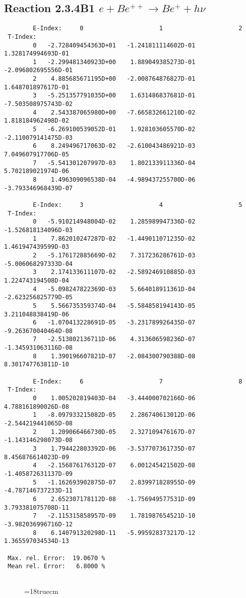 \subsection{
Reaction 2.3.4B1  $e + Be^{++} \rightarrow Be^+ + h\nu$
}

\begin{verbatim}
        E-Index:     0                     1                     2
 T-Index:
        0   -2.728409454363D+01   -1.241811114602D-01    1.328174994693D-01
        1   -2.299481340923D+00    1.889049385273D-01   -2.096802695556D-01
        2    4.885685671195D+00   -2.008764876827D-01    1.648701897617D-01
        3   -5.251357791035D+00    1.631486837681D-01   -7.503508975743D-02
        4    2.543387065980D+00   -7.665832661210D-02    1.818184962498D-02
        5   -6.269100539052D-01    1.928103605570D-02   -2.110079141475D-03
        6    8.249496717063D-02   -2.610043486921D-03    7.049607917706D-05
        7   -5.541301207997D-03    1.802133911336D-04    5.702189021974D-06
        8    1.496309096538D-04   -4.989437255700D-06   -3.793346968439D-07

        E-Index:     3                     4                     5
 T-Index:
        0   -5.910214948004D-02    1.285989947336D-02   -1.526818134096D-03
        1    7.862010247287D-02   -1.449011071235D-02    1.461947439599D-03
        2   -5.176172885669D-02    7.317236286761D-03   -5.006068297333D-04
        3    2.174133611107D-02   -2.589246910885D-03    1.224743194508D-04
        4   -5.098247822369D-03    5.664018911361D-04   -2.623256825779D-05
        5    5.566735359374D-04   -5.584858194143D-05    3.211048838419D-06
        6   -1.070413228691D-05   -3.231789926435D-07   -9.263670040464D-08
        7   -2.513802136711D-06    4.313606598236D-07   -1.345931063116D-08
        8    1.390196607821D-07   -2.084300790388D-08    8.301747763811D-10

        E-Index:     6                     7                     8
 T-Index:
        0    1.005202819403D-04   -3.444000702166D-06    4.788161890026D-08
        1   -8.097933215082D-05    2.286740613012D-06   -2.544219441065D-08
        2    1.209066466730D-05    2.327109476167D-07   -1.143146298073D-08
        3    1.794422803392D-06   -3.537707361735D-07    8.456876614023D-09
        4   -2.156876176312D-07    6.001245421502D-08   -1.405872631137D-09
        5   -1.162693902875D-07    2.839971828955D-09   -4.787146737233D-11
        6    2.652307178112D-08   -1.756949577531D-09    3.793381075708D-11
        7   -2.115315858957D-09    1.781987654521D-10   -3.982036996716D-12
        8    6.140791320298D-11   -5.995928373217D-12    1.365597034534D-13

 Max. rel. Error:  19.0670 %
 Mean rel. Error:   6.8000 %


\end{verbatim}
\begin{figure} \label{2.3.4B1}
\epsfxsize=18truecm
\end{figure}
\newpage
